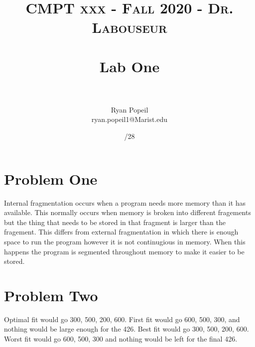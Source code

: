 \documentclass[letterpaper, 10pt,DIV=13]{scrartcl}
\title{	
   \normalfont \normalsize 
   \textsc{CMPT xxx - Fall 2020 - Dr. Labouseur} \\[10pt] %
   \horrule{0.5pt} \\[0.25cm] 	%
   \huge Lab One  \\     	    %
   \horrule{0.5pt} \\[0.25cm] 	%
}
\author{Ryan Popeil \\ \normalsize ryan.popeil1@Marist.edu}
\date{\normalsize\9/28} 	%
\numberwithin{equation}{section} %
\numberwithin{figure}{section} %
\numberwithin{table}{section} %
\begin{document}
\maketitle %

\section{Problem One}
Internal fragmentation occurs when a program needs more memory than it has available.  This normally occurs when 
memory is broken into different fragements but the thing that needs to be stored in that fragment is larger than the fragement.
This differs from external fragmentation in which there is enough space to run the program however it is not continugious in memory.
When this happens the program is segmented throughout memory to make it easier to be stored.


\pagebreak

\section{Problem Two}
Optimal fit would go 300, 500, 200, 600.
First fit would go 600, 500, 300, and nothing would be large enough for the 426.
Best fit would go 300, 500, 200, 600.
Worst fit would go 600, 500, 300 and nothing would be left for the final 426.

\pagebreak



 
\end{document}
